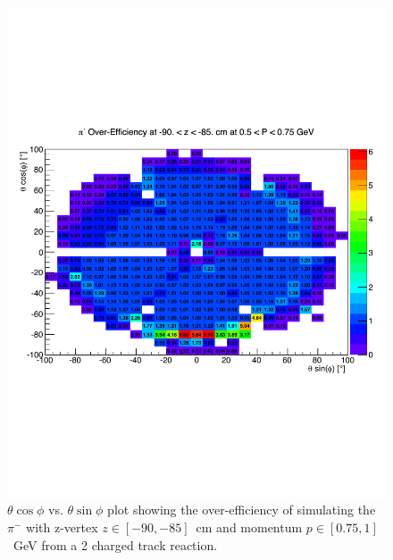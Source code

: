 \begin{v2}
\begin{figure}[htpb]\begin{center}
\includegraphics[width=1.1 \figwidth,height=\hfigheight]{figures/xsec/Pim_Eff.pdf}
\caption{\label{fig:PimEff} $\theta \cos\phi$ vs. $\theta \sin\phi$ plot showing the over-efficiency of simulating the $\pi^-$ with z-vertex $z \in [-90,-85]$~cm and momentum $p \in [0.75,1]$~GeV from a 2 charged track reaction.}
\end{center}\end{figure}


\end{v2}
